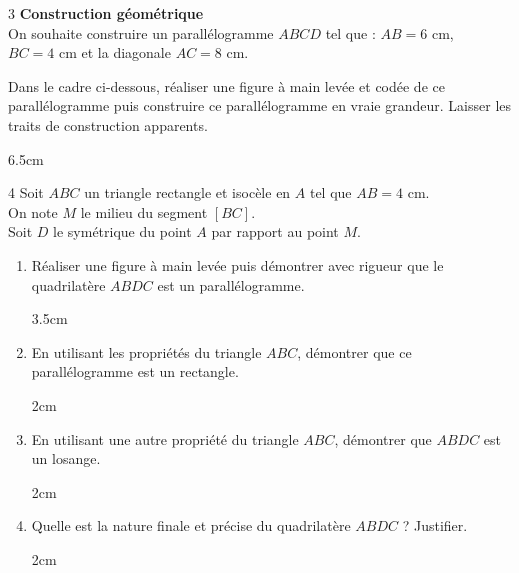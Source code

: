 \documentclass[a4paper]{book}
\begin{document}
{    \begin{exerciceNote}{3}
        \textbf{Construction géométrique} \\
        On souhaite construire un parallélogramme $ABCD$ tel que : 
        $AB = 6\text{ cm}$, $BC = 4\text{ cm}$ et la diagonale $AC = 8\text{ cm}$.
        
        Dans le cadre ci-dessous, réaliser une figure à main levée et codée de ce parallélogramme puis construire ce parallélogramme en vraie grandeur. Laisser les traits de construction apparents.

        \begin{ZoneReponse}{6.5cm}
        \end{ZoneReponse} 
    \end{exerciceNote}

    
    \begin{exerciceNote}{4}
        Soit $ABC$ un triangle rectangle et isocèle en $A$ tel que $AB = 4\text{ cm}$. \\
        On note $M$ le milieu du segment $[BC]$. \\
        Soit $D$ le symétrique du point $A$ par rapport au point $M$.
    
        \begin{enumerate}
            \item Réaliser une figure à main levée puis démontrer avec rigueur que le quadrilatère $ABDC$ est un parallélogramme.
            \begin{ZoneReponse}{3.5cm}
            \end{ZoneReponse}
            
            \item En utilisant les propriétés du triangle $ABC$, démontrer que ce parallélogramme est un rectangle.
            \begin{ZoneReponse}{2cm}
            \end{ZoneReponse}
            
            \item En utilisant une autre propriété du triangle $ABC$, démontrer que $ABDC$ est un losange.
            \begin{ZoneReponse}{2cm}
            \end{ZoneReponse}
            
            \item Quelle est la nature finale et précise du quadrilatère $ABDC$ ? Justifier.
            \begin{ZoneReponse}{2cm}
            \end{ZoneReponse}
        \end{enumerate}
    \end{exerciceNote}

}
\end{document}
